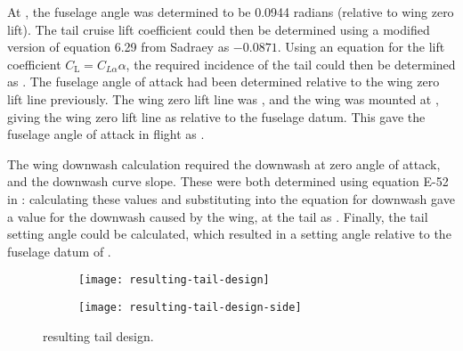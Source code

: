 \documentclass[../../main.tex]{subfiles}
\begin{document}

At , the fuselage angle was determined to be 0.0944 radians (relative to wing zero lift).
The tail cruise lift coefficient could then be determined using a modified version of equation 6.29 from Sadraey \cite{sadraey-13} as $-0.0871$.
Using an equation for the lift coefficient $C_\mathrm{L} = C_{L\alpha}\alpha$, the required incidence of the tail could then be determined as .  %
The fuselage angle of attack had been determined relative to the wing zero lift line previously.
The wing zero lift line was , and the wing was mounted at , giving the wing zero lift line as  relative to the fuselage datum.
This gave the fuselage angle of attack in flight as .  

The wing downwash calculation required the downwash at zero angle of attack, and the downwash curve slope.
These were both determined using equation E-52 in \cite{torenbeek-76}: calculating these values and substituting into the equation for downwash gave a value for the downwash caused by the wing, at the tail as .
Finally, the tail setting angle could be calculated, which resulted in a setting angle relative to the fuselage datum of . 


\begin{figure}[H]

    \centering
    \begin{subfigure}[b]{0.49\columnwidth}
        \centering
        \texttt{[image: resulting-tail-design]}
        \caption{}
        \label{fig:final-tail-design:angle}
    \end{subfigure}
    \hfill
    \begin{subfigure}[b]{0.49\columnwidth}
        \centering
        \texttt{[image: resulting-tail-design-side]}
        \caption{}
        \label{fig:final-tail-design:side}
    \end{subfigure}
    
    \caption{resulting tail design.}
    \label{fig:final-tail-design}
\end{figure} 
\end{document}
